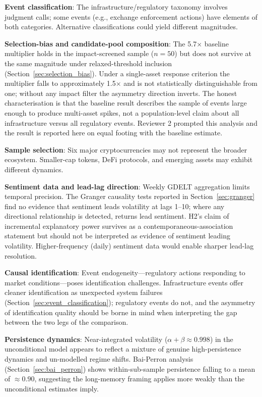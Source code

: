 \documentclass[pdflatex,sn-mathphys-num]{sn-jnl}
\theoremstyle{thmstyleone}
\theoremstyle{thmstyletwo}
\theoremstyle{thmstylethree}
\begin{document}
\textbf{Event classification}: The infrastructure/regulatory taxonomy involves judgment calls; some events (e.g., exchange enforcement actions) have elements of both categories. Alternative classifications could yield different magnitudes.

\textbf{Selection-bias and candidate-pool composition}: The 5.7$\times$ baseline multiplier holds in the impact-screened sample ($n=50$) but does not survive at the same magnitude under relaxed-threshold inclusion (Section~\ref{sec:selection_bias}). Under a single-asset response criterion the multiplier falls to approximately 1.5$\times$ and is not statistically distinguishable from one; without any impact filter the asymmetry direction inverts. The honest characterisation is that the baseline result describes the sample of events large enough to produce multi-asset spikes, not a population-level claim about all infrastructure versus all regulatory events. Reviewer 2 prompted this analysis and the result is reported here on equal footing with the baseline estimate.

\textbf{Sample selection}: Six major cryptocurrencies may not represent the broader ecosystem. Smaller-cap tokens, DeFi protocols, and emerging assets may exhibit different dynamics.

\textbf{Sentiment data and lead-lag direction}: Weekly GDELT aggregation limits temporal precision. The Granger causality tests reported in Section~\ref{sec:granger} find no evidence that sentiment leads volatility at lags 1--10; where any directional relationship is detected, returns lead sentiment. H2's claim of incremental explanatory power survives as a contemporaneous-association statement but should not be interpreted as evidence of sentiment leading volatility. Higher-frequency (daily) sentiment data would enable sharper lead-lag resolution.

\textbf{Causal identification}: Event endogeneity---regulatory actions responding to market conditions---poses identification challenges. Infrastructure events offer cleaner identification as unexpected system failures (Section~\ref{sec:event_classification}); regulatory events do not, and the asymmetry of identification quality should be borne in mind when interpreting the gap between the two legs of the comparison.

\textbf{Persistence dynamics}: Near-integrated volatility ($\alpha+\beta \approx 0.998$) in the unconditional model appears to reflect a mixture of genuine high-persistence dynamics and un-modelled regime shifts. Bai-Perron analysis (Section~\ref{sec:bai_perron}) shows within-sub-sample persistence falling to a mean of $\approx 0.90$, suggesting the long-memory framing applies more weakly than the unconditional estimates imply.
\end{document}
